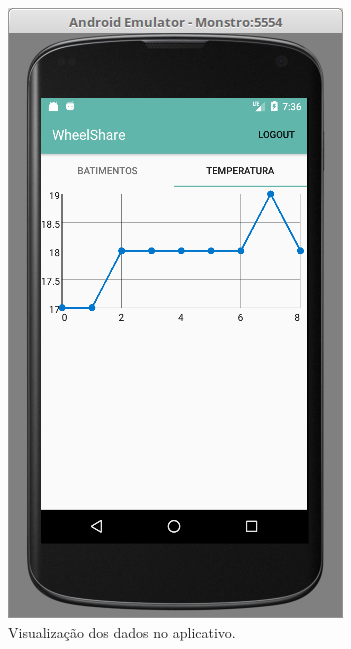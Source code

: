 \begin{figure}[h!]
    \begin{center}
        \includegraphics[scale=0.5]{figuras/android1.png}
    \end{center}
    \caption{Visualização dos dados no aplicativo.}
    \label{fig:android1}
\end{figure}

